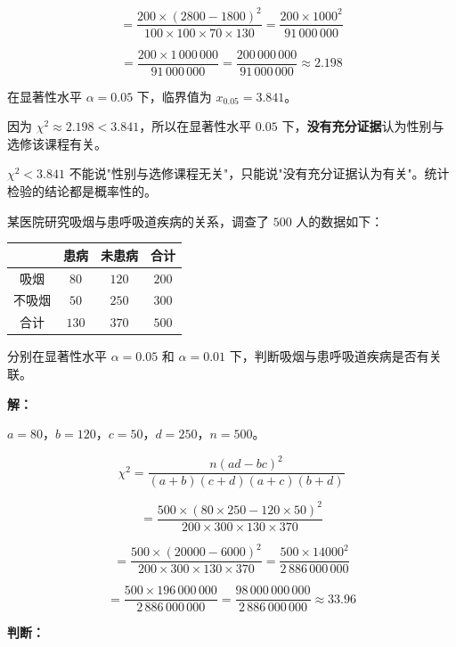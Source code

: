 \documentclass[12pt, a4paper]{ctexart}
\begin{document}
\[
= \frac{200 \times (2800 - 1800)^2}{100 \times 100 \times 70 \times 130} = \frac{200 \times 1000^2}{91\,000\,000}
\]

\[
= \frac{200 \times 1\,000\,000}{91\,000\,000} = \frac{200\,000\,000}{91\,000\,000} \approx 2.198
\]

\medskip
在显著性水平 $\alpha = 0.05$ 下，临界值为 $x_{0.05} = 3.841$。

\medskip
因为 $\chi^2 \approx 2.198 < 3.841$，所以在显著性水平 $0.05$ 下，\textbf{没有充分证据}认为性别与选修该课程有关。

\begin{warnbox}[易错提醒]
$\chi^2 < 3.841$ 不能说"性别与选修课程无关"，只能说"没有充分证据认为有关"。统计检验的结论都是概率性的。
\end{warnbox}

\bigskip

\begin{examplebox}
某医院研究吸烟与患呼吸道疾病的关系，调查了 $500$ 人的数据如下：

\begin{center}
\begin{tabular}{c|cc|c}
\toprule
 & 患病 & 未患病 & 合计 \\
\midrule
吸烟 & $80$ & $120$ & $200$ \\
不吸烟 & $50$ & $250$ & $300$ \\
\midrule
合计 & $130$ & $370$ & $500$ \\
\bottomrule
\end{tabular}
\end{center}

分别在显著性水平 $\alpha = 0.05$ 和 $\alpha = 0.01$ 下，判断吸烟与患呼吸道疾病是否有关联。
\end{examplebox}

\textbf{解：}

$a = 80$，$b = 120$，$c = 50$，$d = 250$，$n = 500$。

\[
\chi^2 = \frac{n(ad - bc)^2}{(a+b)(c+d)(a+c)(b+d)}
\]

\[
= \frac{500 \times (80\times250 - 120\times50)^2}{200 \times 300 \times 130 \times 370}
\]

\[
= \frac{500 \times (20000 - 6000)^2}{200 \times 300 \times 130 \times 370} = \frac{500 \times 14000^2}{2\,886\,000\,000}
\]

\[
= \frac{500 \times 196\,000\,000}{2\,886\,000\,000} = \frac{98\,000\,000\,000}{2\,886\,000\,000} \approx 33.96
\]

\medskip
\textbf{判断：}
\end{document}
